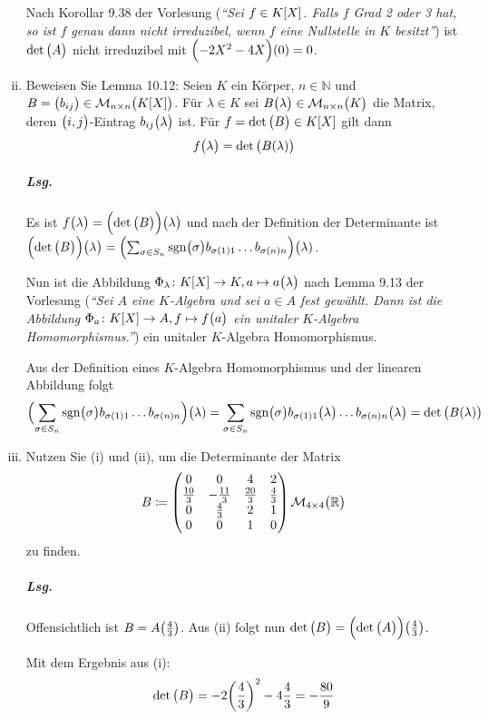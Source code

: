 \documentclass{scrreprt}
\newcommand{\sgn}{\text{sgn}}
\begin{document}
\begin{enumerate}[(i)]
  Nach Korollar 9.38 der Vorlesung (\emph{``Sei $f \in K\qty[X]$.
    Falls $f$ Grad 2 oder 3 hat, so ist $f$ genau dann nicht irreduzibel,
    wenn $f$ eine Nullstelle in $K$ besitzt''}) ist $\det\qty\big(A)$
  nicht irreduzibel mit $\qty\Big(-2X^2 - 4X)(0) = 0$.

\item Beweisen Sie Lemma 10.12: Seien $K$ ein Körper, $n \in \mathbb{N}$ und
  $B = \qty\big(b_{ij}) \in \mathcal{M}_{n \times n}\qty\big(K\qty[X])$.
  Für $\lambda \in K$ sei
  $B\qty\big(\lambda) \in \mathcal{M}_{n \times n}\qty\big(K)$ die Matrix, deren
  $\qty\big(i, j)$-Eintrag $b_{ij}\qty\big(\lambda)$ ist.
  Für $f = \det\qty\big(B) \in K\qty[X]$ gilt dann
  \[
    f\qty\big(\lambda) = \det\qty\big(B\qty(\lambda))
  \]

  \subparagraph{Lsg.} Es ist
  $f\qty\big(\lambda) = \qty\Big(\det\qty\big(B))\qty\big(\lambda)$ und nach
  der Definition der Determinante ist
  $\qty\Big(\det\qty\big(B))\qty\big(\lambda) =
  \qty\Big(
    \sum_{\sigma \in S_n}
    \sgn\qty\big(\sigma)
    b_{\sigma(1)1} \ldots b_{\sigma(n)n}
  )\big(\lambda)$.

  Nun ist die Abbildung
  $\Phi_{\lambda} \colon K\qty[X] \to K, a \mapsto a\qty\big(\lambda)$
  nach Lemma 9.13 der Vorlesung (\emph{``Sei $A$ eine $K$-Algebra und sei
    $a \in A$ fest gewählt.
    Dann ist die Abbildung
    $\Phi_a \colon K\qty[X] \to A, f \mapsto f\qty\big(a)$
    ein unitaler $K$-Algebra Homomorphismus.''})
  ein unitaler $K$-Algebra Homomorphismus.

  Aus der Definition eines  $K$-Algebra Homomorphismus und der linearen
  Abbildung folgt
  \[
    \qty\Big(
      \sum_{\sigma \in S_n}
      \sgn\qty\big(\sigma)
      b_{\sigma(1)1} \ldots b_{\sigma(n)n}
    )\big(\lambda) =
    \sum_{\sigma \in S_n}
    \sgn\qty\big(\sigma)
    b_{\sigma(1)1}\qty\big(\lambda) \ldots b_{\sigma(n)n}\qty\big(\lambda)
    = \det\qty\big(B(\lambda))
  \]

\item Nutzen Sie (i) und (ii), um die Determinante der Matrix
  \[
    B \coloneqq \begin{pmatrix}
      0 & 0 & 4 & 2 \\
      \frac{10}{3} & -\frac{11}{3} & \frac{20}{3} & \frac{4}{3} \\
      0 & \frac{4}{3} & 2 & 1 \\
      0 & 0 & 1 & 0 \\
    \end{pmatrix} \mathcal{M}_{4 \times 4}\qty\big(\mathbb{R})
  \]
  zu finden.

  \subparagraph{Lsg.} Offensichtlich ist $B = A\qty(\frac{4}{3})$.
  Aus (ii) folgt nun
  $\det\qty\big(B) = \qty\Big(\det\qty\big(A))\qty(\frac{4}{3})$.

  Mit dem Ergebnis aus (i):
  \[
    \det\qty\big(B) = -2\qty(\frac{4}{3})^2 - 4\frac{4}{3}
    = -\frac{80}{9}
  \]
\end{enumerate}
\end{document}
